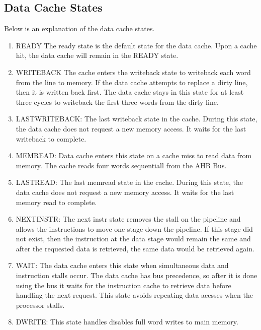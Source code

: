 \subsection{Data Cache States}
\label{sec:dstate}

Below is an explanation of the data cache states.

\begin{enumerate}
	\item READY 
	The ready state is the default state for the data cache.
	Upon a cache hit, the data cache will remain in the READY state.

	\item WRITEBACK
	The cache enters the writeback state to writeback each word from the line to memory.
	If the data cache attempts to replace a dirty line, then it is written back first.
	The data cache stays in this state for at least three cycles to writeback the first three words from the dirty line.

	\item LASTWRITEBACK:
	The last writeback state in the cache. 
	During this state, the data cache does not request a new memory access.
	It waits for the last writeback to complete.

	\item MEMREAD:
	Data cache enters this state on a cache miss to read data from memory.
	The cache reads four words sequentiall from the AHB Bus.

	\item LASTREAD:
	The last memread state in the cache. 
	During this state, the data cache does not request a new memory access.
	It waits for the last memory read to complete.

	\item NEXTINSTR:
	The next instr state removes the stall on the pipeline and allows the instructions to move one stage down the pipeline. If this stage did not exist, then the instruction at the data stage would remain the same and after the requested data is retrieved, the same data would be retrieved again. 

	\item WAIT:
	The data cache enters this state when simultaneous data and instruction stalls occur. 
	The data cache has bus precedence, so after it is done using the bus it waits for the instruction cache to retrieve data before handling the next request. 
	This state avoids repeating data acesses when the processor stalls.

	\item DWRITE:
	This state handles disables full word writes to main memory.
	
\end{enumerate}
